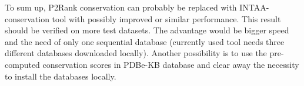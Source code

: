 To sum up, P2Rank conservation can probably be replaced with INTAA-conservation tool with possibly improved or similar performance. This result should be verified on more test datasets. The advantage would be bigger speed and the need of only one sequential database (currently used tool needs three different databases downloaded locally). Another possibility is to use the pre-computed conservation scores in PDBe-KB database and clear away the necessity to install the databases locally.





